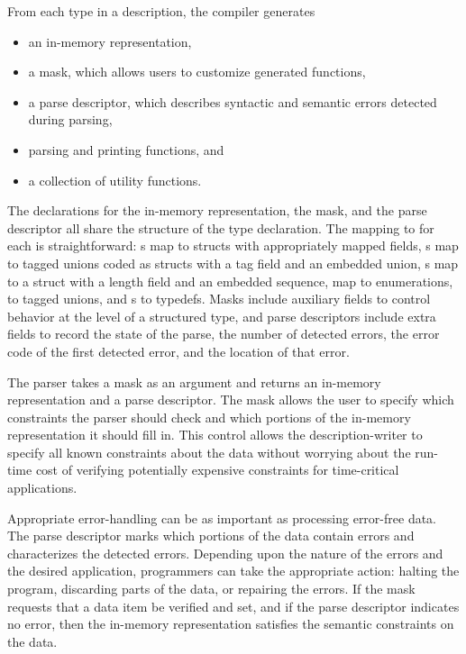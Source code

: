 From each type in a \pads{} description, the compiler generates 
\begin{itemize}
\setlength{\itemsep}{0ex plus0.2ex}
\item an in-memory representation, 
\item a mask, which allows users to customize generated functions,
\item a parse descriptor, which describes syntactic and
semantic errors detected during parsing, 
\item parsing and printing functions, and 
\item a collection of utility functions.
\end{itemize}
%

The \C{} declarations for the in-memory representation, the mask, 
and the parse descriptor all share the structure of the \pads{}
type declaration.  The mapping to \C{} for each is straightforward: 
s map to \C{} structs with appropriately mapped fields, 
s map to tagged unions coded as \C{} structs with a tag field 
and an embedded 
union, s map to a \C{} struct with a length field and an 
embedded sequence,  map to \C{} enumerations,  
to tagged unions, and s to \C{} typedefs.  Masks include
auxiliary fields to control behavior at the level of a structured
type, and parse descriptors include extra fields to record the 
state of the parse, the number of detected errors, 
the error code of the first detected error, and the location of that error.

The parser takes a mask as an argument and returns an
in-memory representation and a parse descriptor.  
The mask allows the user to specify 
which constraints the parser should check and which portions of the
in-memory representation it should fill in.  This control allows the
description-writer to specify all known constraints about the data
without worrying about the run-time cost of verifying potentially
expensive constraints for time-critical applications.

Appropriate error-handling can be as important as processing
error-free data.  The parse descriptor marks which portions of the
data contain errors and characterizes the detected errors.
Depending upon the nature of the errors and the desired application,
programmers can take the appropriate action: halting the program,
discarding parts of the data, or repairing the errors.
If the mask requests
that a data item be verified and set, and if the parse descriptor
indicates no error, then the in-memory representation satisfies the
semantic constraints on the data.

